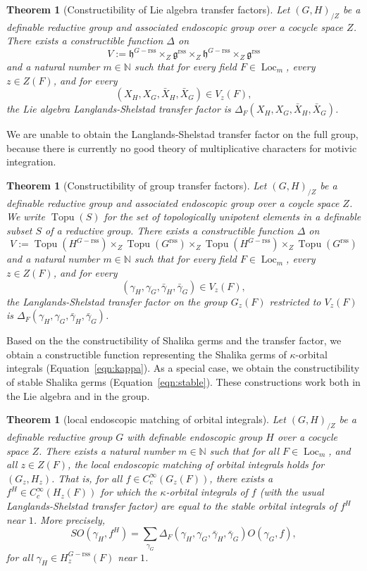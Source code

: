 \documentclass[12pt]{amsart}
\newcommand{\op}[1]{\operatorname{#1}}
\newcommand{\ring}[1]{{\mathbb #1}}
\newcommand{\fg}{\mathfrak{g}}
\newcommand{\fh}{\mathfrak{h}}
\newcommand{\reg}{\mathrm{rss}}
\theoremstyle{plain}
\newtheorem{theorem}[thm]{Theorem}
\theoremstyle{definition}
\begin{document}
\begin{theorem}[Constructibility of Lie algebra transfer
  factors]\label{thm:xfer-factor} 
Let
  $(G,H)_{/Z}$ be a definable reductive group and associated
  endoscopic group over a cocycle space $Z$.  There exists a
  constructible function $\Delta$ on
\begin{equation}\label{eqn:delta-domain}
V := \fh^{G-\reg}\times_Z
  \fg^\reg\times_Z
\fh^{G-\reg}\times_Z
  \fg^\reg
\end{equation}
and a natural number $m\in \ring{N}$ such that for every field $F\in
\op{Loc}_{m}$, every $z\in Z(F)$, and for every 
\[
(X_H,X_G,\bar X_H,\bar X_G)\in
V_z(F),\]  
the Lie algebra Langlands-Shelstad transfer factor is
$\Delta_F(X_H,X_G,\bar X_H,\bar X_G)$.
\end{theorem}

We are unable to obtain the Langlands-Shelstad
transfer factor on the full group, because there is currently no good
theory of multiplicative characters for motivic integration.

\begin{theorem}[Constructibility of group transfer factors] Let
  $(G,H)_{/Z}$ be a definable reductive group and associated
  endoscopic group over a coycle space $Z$.  We write $\op{Topu}(S)$
  for the set of topologically unipotent elements in a definable
  subset $S$ of a reductive group.  There exists a constructible
  function $\Delta$ on
\[
V := \op{Topu}(H^{G-\reg})\times_Z
  \op{Topu}(G^\reg)\times_Z
\op{Topu}(H^{G-\reg})\times_Z
  \op{Topu}(G^\reg)
\] 
and a natural number $m\in \ring{N}$ such that for every field $F\in
\op{Loc}_{m}$, every $z\in Z(F)$, and for every 
\[
(\gamma_H,\gamma_G,\bar \gamma_H,\bar \gamma_G)\in V_z(F),\] the
Langlands-Shelstad transfer factor on the group $G_z(F)$ restricted to
$V_z(F)$ is $\Delta_F(\gamma_H,\gamma_G,\bar \gamma_H,\bar
\gamma_G)$.
\end{theorem}

Based on the the constructibility of Shalika germs and the transfer
factor, we obtain a constructible function representing the Shalika
germs of $\kappa$-orbital integrals (Equation~\ref{eqn:kappa}).  As a
special case, we obtain the constructibility of stable Shalika germs
(Equation~\ref{eqn:stable}).  These constructions work both in the Lie
algebra and in the group.

\begin{theorem}[local endoscopic matching of orbital integrals]\label{thm:local}
  Let $(G,H)_{/Z}$ be a definable reductive group $G$ with definable
  endoscopic group $H$ over a cocycle space $Z$.  There exists a
  natural number $m\in \ring{N}$ such that for all $F\in
  \op{Loc}_{m}$, and all $z\in Z(F)$, the local endoscopic matching of
  orbital integrals holds for $(G_z,H_z)$.  That is, for all $f\in
  C_c^\infty(G_z(F))$, there exists a $f^H\in C_c^\infty(H_z(F))$ for
  which the $\kappa$-orbital integrals of $f$ (with the usual
  Langlands-Shelstad transfer factor) are equal to the stable orbital
  integrals of $f^H$ near $1$. More precisely,
\[
SO(\gamma_H,f^H) = \sum_{\gamma_G} \Delta_F(\gamma_H,\gamma_G,\bar
\gamma_H,\bar \gamma_G) O(\gamma_G,f),
\]
for all $\gamma_H\in H^{G-\reg}_z(F)$ near $1$.
\end{theorem}
\end{document}
